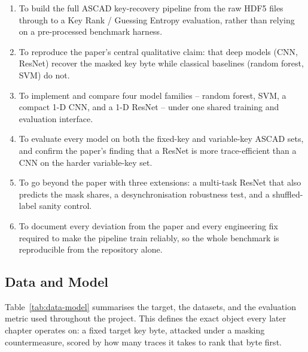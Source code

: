 \begin{enumerate}
\item To build the full ASCAD key-recovery pipeline from the raw HDF5 files through
      to a Key Rank / Guessing Entropy evaluation, rather than relying on a
      pre-processed benchmark harness.
\item To reproduce the paper's central qualitative claim: that deep models (CNN,
      ResNet) recover the masked key byte while classical baselines (random forest,
      SVM) do not.
\item To implement and compare four model families -- random forest, SVM, a compact
      1-D CNN, and a 1-D ResNet -- under one shared training and evaluation
      interface.
\item To evaluate every model on both the fixed-key and variable-key ASCAD sets, and
      confirm the paper's finding that a ResNet is more trace-efficient than a CNN on
      the harder variable-key set.
\item To go beyond the paper with three extensions: a multi-task ResNet that also
      predicts the mask shares, a desynchronisation robustness test, and a
      shuffled-label sanity control.
\item To document every deviation from the paper and every engineering fix required
      to make the pipeline train reliably, so the whole benchmark is reproducible
      from the repository alone.
\end{enumerate}

\subsection{Data and Model}

Table~\ref{tab:data-model} summarises the target, the datasets, and the evaluation
metric used throughout the project. This defines the exact object every later chapter
operates on: a fixed target key byte, attacked under a masking countermeasure, scored
by how many traces it takes to rank that byte first.

